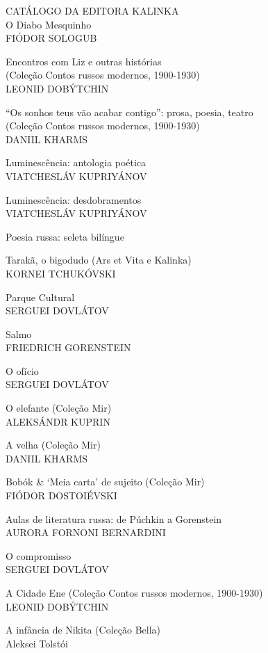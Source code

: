 \tiny{
\noindent{}CATÁLOGO DA EDITORA KALINKA\\[5pt]

\noindent{}O Diabo Mesquinho\\
FIÓDOR SOLOGUB
\medskip

\noindent{}Encontros com Liz e outras histórias\\(Coleção Contos russos modernos, 1900-1930)\\
LEONID DOBÝTCHIN
\medskip

\noindent{}“Os sonhos teus vão acabar contigo”: prosa, poesia, teatro\\(Coleção Contos russos modernos, 1900-1930)\\
DANIIL KHARMS
\medskip

\noindent{}Luminescência: antologia poética\\
VIATCHESLÁV KUPRIYÁNOV
\medskip

\noindent{}Luminescência: desdobramentos\\
VIATCHESLÁV KUPRIYÁNOV
\medskip

\noindent{}Poesia russa: seleta bilíngue
\medskip

\noindent{}Tarakã, o bigodudo (Ars et Vita e Kalinka)\\
KORNEI TCHUKÓVSKI
\medskip

\noindent{}Parque Cultural\\
SERGUEI DOVLÁTOV
\medskip

\noindent{}Salmo\\
FRIEDRICH GORENSTEIN
\medskip

\noindent{}O ofício\\
SERGUEI DOVLÁTOV
\medskip

\noindent{}O elefante (Coleção Mir)\\
ALEKSÁNDR KUPRIN
\medskip

\noindent{}A velha (Coleção Mir)\\
DANIIL KHARMS 
\medskip

\noindent{}Bobók \& ‘Meia carta’ de sujeito (Coleção Mir)\\
FIÓDOR DOSTOIÉVSKI
\medskip

\noindent{}Aulas de literatura russa: de Púchkin a Gorenstein \\
AURORA FORNONI BERNARDINI
\medskip

\noindent{}O compromisso\\
SERGUEI DOVLÁTOV
\medskip

\noindent{}A Cidade Ene (Coleção Contos russos modernos, 1900-1930)\\
LEONID DOBÝTCHIN
\medskip

\noindent{}A infância de Nikita (Coleção Bella)\\
Aleksei Tolstói
}

